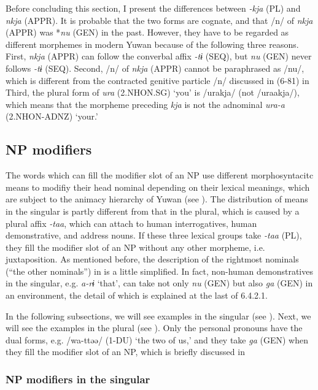   Before concluding this section, I present the differences between \textit{{}-kja} (PL) and \textit{nkja} (APPR). It is probable that the two forms are cognate, and that /n/ of \textit{nkja} (APPR) was *\textit{nu} (GEN) in the past. However, they have to be regarded as different morphemes in modern Yuwan because of the following three reasons. First, \textit{nkja} (APPR) can follow the converbal affix \textit{-tɨ} (SEQ), but \textit{nu} (GEN) never follows \textit{{}-tɨ} (SEQ). Second, /n/ of \textit{nkja} (APPR) cannot be paraphrased as /nu/, which is different from the contracted genitive particle /n/ discussed in (6-81) in  Third, the plural form of \textit{ura} (2.NHON.SG) ‘you’ is /urakja/ (not /uraakja/), which means that the morpheme preceding \textit{kja} is not the adnominal \textit{ura-a} (2.NHON-ADNZ) ‘your.’

\subsection{NP modifiers}

The words which can fill the modifier slot of an NP use different morphosyntacitc means to modifiy their head nominal depending on their lexical meanings, which are subject to the animacy hierarchy of Yuwan (see ). The distribution of means in the singular is partly different from that in the plural, which is caused by a plural affix \textit{{}-taa}, which can attach to human interrogatives, human demonstrative, and address nouns. If these three lexical groups take \textit{{}-taa} (PL), they fill the modifier slot of an NP without any other morpheme, i.e. juxtaposition. As mentioned before, the description of the rightmost nominals (“the other nominals”) in  is a little simplified. In fact, non-human demonstratives in the singular, e.g. \textit{a-rɨ} ‘that’, can take not only \textit{nu} (GEN) but also \textit{ga} (GEN) in an environment, the detail of which is explained at the last of 6.4.2.1.

In the following subsections, we will see examples in the singular (see ). Next, we will see the examples in the plural (see ). Only the personal pronouns have the dual forms, e.g. /wa-ttəə/ (1-DU) ‘the two of us,’ and they take \textit{ga} (GEN) when they fill the modifier slot of an NP, which is briefly discussed in 

\subsubsection{NP modifiers in the singular}

